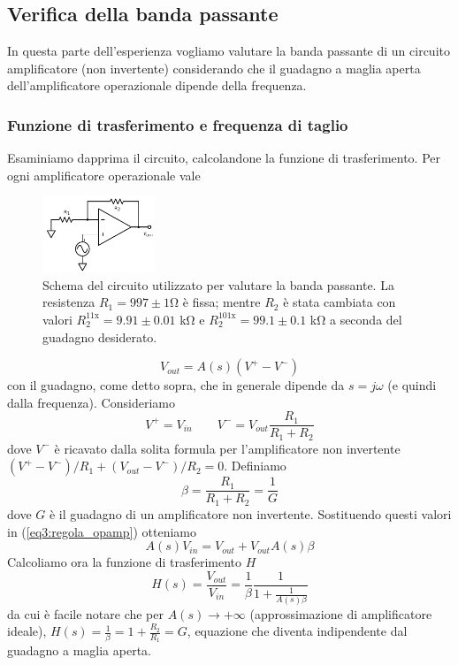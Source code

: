 \subsection{Verifica della banda passante}

In questa parte dell'esperienza vogliamo valutare la banda passante di un circuito amplificatore (non invertente) considerando che il guadagno a maglia aperta dell'amplificatore operazionale dipende della frequenza.

\subsubsection{Funzione di trasferimento e frequenza di taglio}

Esaminiamo dapprima il circuito, calcolandone la funzione di trasferimento. Per ogni amplificatore operazionale vale
\begin{figure}
  \begin{center}
    \includegraphics[width=0.30\textwidth]{../E03/latex/bandwidth.pdf}
  \end{center}
  \caption{Schema del circuito utilizzato per valutare la banda passante. La resistenza $R_1=997\pm1$\si{\ohm} è fissa; mentre $R_2$ è stata cambiata con valori $R_2^{11\mathrm{x}}=9.91 \pm 0.01$ \si{\kilo\ohm} e $R_2^{101\mathrm{x}}=99.1 \pm 0.1$ \si{\kilo\ohm} a seconda del guadagno desiderato.}
  \label{cir3:banda}
\end{figure}
\begin{equation}
V_{out}=A(s) (V^+-V^-)
\label{eq3:regola_opamp}
\end{equation}
con il guadagno, come detto sopra, che in generale dipende da $s=j\omega$ (e quindi dalla frequenza). Consideriamo
$$V^+ = V_{in} \qquad V^-=V_{out} \frac{R_1}{R_1+R_2}$$
dove $V^-$ è ricavato dalla solita formula per l'amplificatore non invertente $(V^+-V^-)/R_1 + (V_{out}-V^-)/R_2 =0$. Definiamo
$$\beta = \frac{R_1}{R_1+R_2} = \frac{1}{G}$$
dove $G$ è il guadagno di un amplificatore non invertente. Sostituendo questi valori in (\ref{eq3:regola_opamp}) otteniamo
$$A(s) V_{in} = V_{out} + V_{out} A(s) \beta$$
Calcoliamo ora la funzione di trasferimento $H$
\begin{equation}
H(s)=\frac{V_{out}}{V_{in}}=\frac{1}{\beta}\frac{1}{1+\frac{1}{A(s) \beta}}
\label{eq3:funz_trasfe}
\end{equation}
da cui è facile notare che per $A(s) \rightarrow + \infty$ (approssimazione di amplificatore ideale), $H(s)=\frac{1}{\beta}=1+\frac{R_2}{R_1}=G$, equazione che diventa indipendente dal guadagno a maglia aperta.

